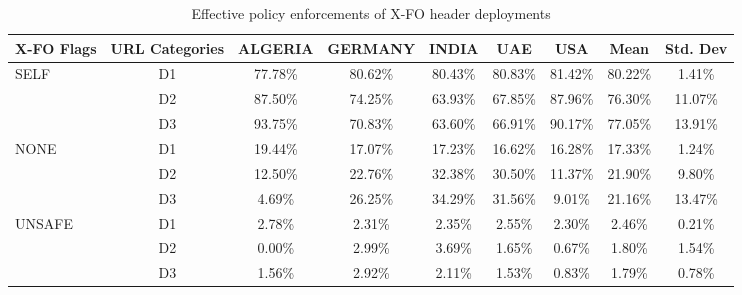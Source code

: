 \begin{table}[!ht]
    \centering
    \footnotesize
    \label{tab:sec-lot-xfo}
    \caption{Effective policy enforcements of X-FO header deployments}
    \begin{tabular}{l|c|c|c|c|c|c|c|c}
    \toprule
        X-FO Flags & URL Categories & ALGERIA & GERMANY & INDIA & UAE & USA & Mean & Std. Dev \\ \midrule
        \multirow{3}{*}{SELF} & D1 & 77.78\% & 80.62\% & 80.43\% & 80.83\% & 81.42\% & 80.22\% & 1.41\% \\ 
        ~ & D2 & 87.50\% & 74.25\% & 63.93\% & 67.85\% & 87.96\% & 76.30\% & 11.07\% \\
        ~ & D3 & 93.75\% & 70.83\% & 63.60\% & 66.91\% & 90.17\% & 77.05\% & 13.91\% \\ \hline
        \multirow{3}{*}{NONE} & D1 & 19.44\% & 17.07\% & 17.23\% & 16.62\% & 16.28\% & 17.33\% & 1.24\% \\ 
        ~ & D2 & 12.50\% & 22.76\% & 32.38\% & 30.50\% & 11.37\% & 21.90\% & 9.80\% \\
        ~ & D3 & 4.69\% & 26.25\% & 34.29\% & 31.56\% & 9.01\% & 21.16\% & 13.47\% \\ \hline
        \multirow{3}{*}{UNSAFE} & D1 & 2.78\% & 2.31\% & 2.35\% & 2.55\% & 2.30\% & 2.46\% & 0.21\% \\ 
        ~ & D2 & 0.00\% & 2.99\% & 3.69\% & 1.65\% & 0.67\% & 1.80\% & 1.54\% \\
        ~ & D3 & 1.56\% & 2.92\% & 2.11\% & 1.53\% & 0.83\% & 1.79\% & 0.78\% \\ \bottomrule
    \end{tabular}
\end{table}

